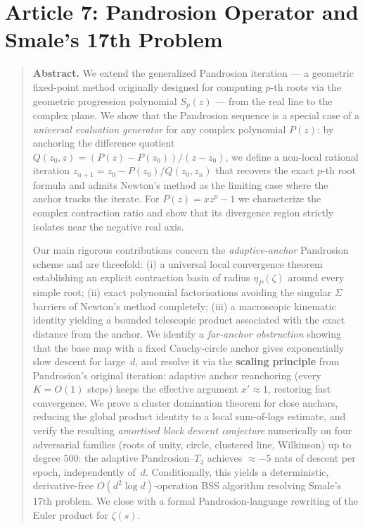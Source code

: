 \documentclass[10pt,a4paper,oneside]{book}
\theoremstyle{definition}
\theoremstyle{remark}
\newenvironment{abstract}{\begin{quote}\small\textbf{Abstract.}}{\end{quote}}
\begin{document}
\chapter{Article 7: Pandrosion Operator and Smale's 17th Problem}
\graphicspath{{../smale/}{../../figures/}{../smale/figures/}}


\begin{abstract}
We extend the generalized Pandrosion iteration --- a geometric fixed-point method originally designed for computing $p$-th roots via the geometric progression polynomial $S_p(z)$ --- from the real line to the complex plane.  We show that the Pandrosion sequence is a special case of a \emph{universal evaluation generator} for any complex polynomial $P(z)$: by anchoring the difference quotient $Q(z_0, z) = (P(z) - P(z_0))/(z - z_0)$, we define a non-local rational iteration $z_{n+1} = z_0 - P(z_0)/Q(z_0, z_n)$ that recovers the exact $p$-th root formula and admits Newton's method as the limiting case where the anchor tracks the iterate.  For $P(z) = xz^p - 1$ we characterize the complex contraction ratio and show that its divergence region strictly isolates near the negative real axis.

Our main rigorous contributions concern the \emph{adaptive-anchor} Pandrosion scheme and are threefold: (i) a universal local convergence theorem establishing an explicit contraction basin of radius $\eta_P(\zeta)$ around every simple root; (ii) exact polynomial factorisations avoiding the singular $\Sigma$ barriers of Newton's method completely; (iii) a macroscopic kinematic identity yielding a bounded telescopic product associated with the exact distance from the anchor. We identify a \emph{far-anchor obstruction} showing that the base map with a fixed Cauchy-circle anchor gives exponentially slow descent for large~$d$, and resolve it via the \textbf{scaling principle} from Pandrosion's original iteration: adaptive anchor reanchoring (every $K = O(1)$ steps) keeps the effective argument $x' \approx 1$, restoring fast convergence.  We prove a cluster domination theorem for close anchors, reducing the global product identity to a local sum-of-logs estimate, and verify the resulting \emph{amortised block descent conjecture} numerically on four adversarial families (roots of unity, circle, clustered line, Wilkinson) up to degree $500$: the adaptive Pandrosion--$T_3$ achieves $\approx -5$ nats of descent per epoch, independently of~$d$.  Conditionally, this yields a deterministic, derivative-free $O(d^2\log d)$-operation BSS algorithm resolving Smale's 17th problem.  We close with a formal Pandrosion-language rewriting of the Euler product for $\zeta(s)$.
\end{abstract}
\end{document}
